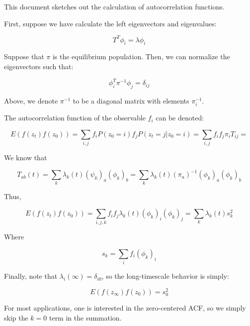 \documentclass[12pt]{article}
\begin{document}
This document sketches out the calculation of autocorrelation functions.  


First, suppose we have calculate the left eigenvectors and eigenvalues:

$$T^T \phi_i = \lambda \phi_i$$

Suppose that $\pi$ is the equilibrium population.  Then, we can normalize the eigenvectors such that:

$$\phi_i^T \pi^{-1} \phi_j = \delta_{ij}$$

Above, we denote $\pi^{-1}$ to be a diagonal matrix with elements $\pi_i^{-1}$.

The autocorrelation function of the observable $f_i$ can be denoted:

$$E(f(z_t) f(z_0)) = \sum_{i,j} f_i P(z_0 = i) f_j P(z_t = j | z_0 = i) = \sum_{i,j} f_i  f_j \pi_i T_{ij} = $$

We know that

$$T_{ab}(t) = \sum_k \lambda_k(t) (\psi_k)_a (\phi_k)_b = \sum_k \lambda_k(t) (\pi_a)^{-1} (\phi_k)_a (\phi_k)_b$$

Thus,

$$E(f(z_t) f(z_0)) = \sum_{i,j,k} f_i f_j \lambda_k(t) (\phi_k)_i (\phi_k)_j = \sum_k \lambda_k(t) s_k^2$$

Where 

$$s_k = \sum_i f_i (\phi_k)_i$$

Finally, note that $\lambda_i(\infty) = \delta_{i0}$, so the long-timescale behavior is simply:

$$E(f(z_\infty) f(z_0)) = s_0^2$$

For most applications, one is interested in the zero-centered ACF, so we simply skip the $k = 0$ term in the summation.
\end{document}
